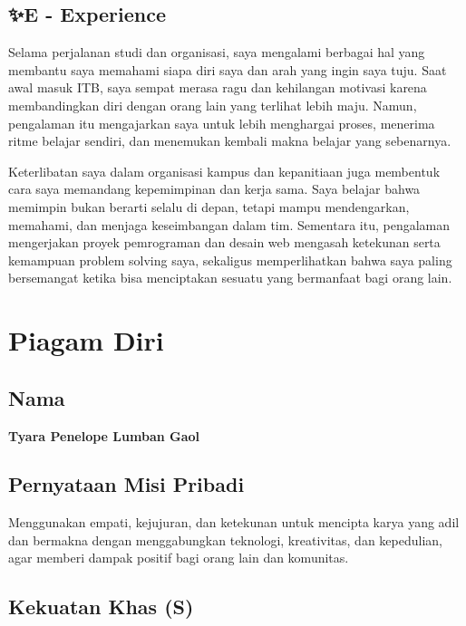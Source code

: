 \documentclass[
  letterpaper,
  DIV=11,
  numbers=noendperiod]{scrreprt}
\begin{document}
\section{✨E - Experience}\label{e---experience}

Selama perjalanan studi dan organisasi, saya mengalami berbagai hal yang
membantu saya memahami siapa diri saya dan arah yang ingin saya tuju.
Saat awal masuk ITB, saya sempat merasa ragu dan kehilangan motivasi
karena membandingkan diri dengan orang lain yang terlihat lebih maju.
Namun, pengalaman itu mengajarkan saya untuk lebih menghargai proses,
menerima ritme belajar sendiri, dan menemukan kembali makna belajar yang
sebenarnya.

Keterlibatan saya dalam organisasi kampus dan kepanitiaan juga membentuk
cara saya memandang kepemimpinan dan kerja sama. Saya belajar bahwa
memimpin bukan berarti selalu di depan, tetapi mampu mendengarkan,
memahami, dan menjaga keseimbangan dalam tim. Sementara itu, pengalaman
mengerjakan proyek pemrograman dan desain web mengasah ketekunan serta
kemampuan problem solving saya, sekaligus memperlihatkan bahwa saya
paling bersemangat ketika bisa menciptakan sesuatu yang bermanfaat bagi
orang lain.


\chapter{Piagam Diri}\label{piagam-diri}

\section{Nama}\label{nama}

\textbf{Tyara Penelope Lumban Gaol}

\section{Pernyataan Misi Pribadi}\label{pernyataan-misi-pribadi}

Menggunakan empati, kejujuran, dan ketekunan untuk mencipta karya yang
adil dan bermakna dengan menggabungkan teknologi, kreativitas, dan
kepedulian, agar memberi dampak positif bagi orang lain dan komunitas.

\section{Kekuatan Khas (S)}\label{kekuatan-khas-s}
\end{document}
